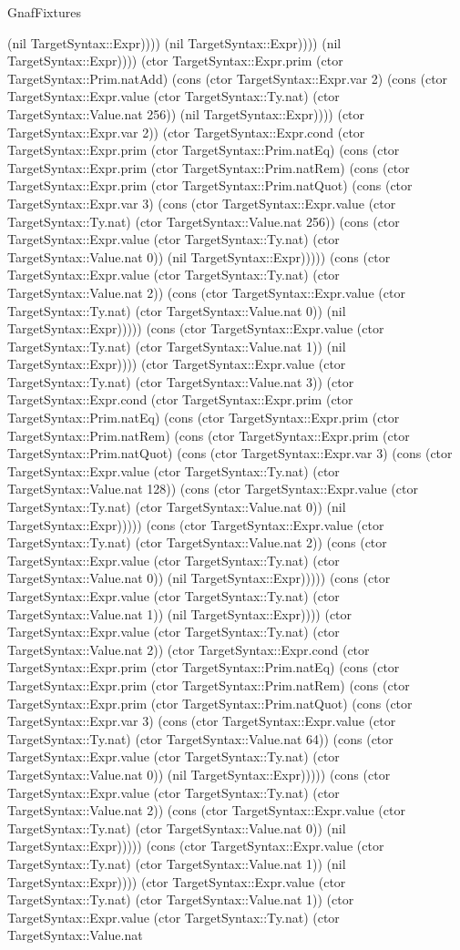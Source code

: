 \begin{lexlean}{GnafFixtures}
\begin{semanticmodule}
{(nil TargetSyntax::Expr)))) (nil TargetSyntax::Expr)))) (nil TargetSyntax::Expr)))) (ctor TargetSyntax::Expr.prim (ctor TargetSyntax::Prim.natAdd) (cons (ctor TargetSyntax::Expr.var 2) (cons (ctor TargetSyntax::Expr.value (ctor TargetSyntax::Ty.nat) (ctor TargetSyntax::Value.nat 256)) (nil TargetSyntax::Expr)))) (ctor TargetSyntax::Expr.var 2)) (ctor TargetSyntax::Expr.cond (ctor TargetSyntax::Expr.prim (ctor TargetSyntax::Prim.natEq) (cons (ctor TargetSyntax::Expr.prim (ctor TargetSyntax::Prim.natRem) (cons (ctor TargetSyntax::Expr.prim (ctor TargetSyntax::Prim.natQuot) (cons (ctor TargetSyntax::Expr.var 3) (cons (ctor TargetSyntax::Expr.value (ctor TargetSyntax::Ty.nat) (ctor TargetSyntax::Value.nat 256)) (cons (ctor TargetSyntax::Expr.value (ctor TargetSyntax::Ty.nat) (ctor TargetSyntax::Value.nat 0)) (nil TargetSyntax::Expr))))) (cons (ctor TargetSyntax::Expr.value (ctor TargetSyntax::Ty.nat) (ctor TargetSyntax::Value.nat 2)) (cons (ctor TargetSyntax::Expr.value (ctor TargetSyntax::Ty.nat) (ctor TargetSyntax::Value.nat 0)) (nil TargetSyntax::Expr))))) (cons (ctor TargetSyntax::Expr.value (ctor TargetSyntax::Ty.nat) (ctor TargetSyntax::Value.nat 1)) (nil TargetSyntax::Expr)))) (ctor TargetSyntax::Expr.value (ctor TargetSyntax::Ty.nat) (ctor TargetSyntax::Value.nat 3)) (ctor TargetSyntax::Expr.cond (ctor TargetSyntax::Expr.prim (ctor TargetSyntax::Prim.natEq) (cons (ctor TargetSyntax::Expr.prim (ctor TargetSyntax::Prim.natRem) (cons (ctor TargetSyntax::Expr.prim (ctor TargetSyntax::Prim.natQuot) (cons (ctor TargetSyntax::Expr.var 3) (cons (ctor TargetSyntax::Expr.value (ctor TargetSyntax::Ty.nat) (ctor TargetSyntax::Value.nat 128)) (cons (ctor TargetSyntax::Expr.value (ctor TargetSyntax::Ty.nat) (ctor TargetSyntax::Value.nat 0)) (nil TargetSyntax::Expr))))) (cons (ctor TargetSyntax::Expr.value (ctor TargetSyntax::Ty.nat) (ctor TargetSyntax::Value.nat 2)) (cons (ctor TargetSyntax::Expr.value (ctor TargetSyntax::Ty.nat) (ctor TargetSyntax::Value.nat 0)) (nil TargetSyntax::Expr))))) (cons (ctor TargetSyntax::Expr.value (ctor TargetSyntax::Ty.nat) (ctor TargetSyntax::Value.nat 1)) (nil TargetSyntax::Expr)))) (ctor TargetSyntax::Expr.value (ctor TargetSyntax::Ty.nat) (ctor TargetSyntax::Value.nat 2)) (ctor TargetSyntax::Expr.cond (ctor TargetSyntax::Expr.prim (ctor TargetSyntax::Prim.natEq) (cons (ctor TargetSyntax::Expr.prim (ctor TargetSyntax::Prim.natRem) (cons (ctor TargetSyntax::Expr.prim (ctor TargetSyntax::Prim.natQuot) (cons (ctor TargetSyntax::Expr.var 3) (cons (ctor TargetSyntax::Expr.value (ctor TargetSyntax::Ty.nat) (ctor TargetSyntax::Value.nat 64)) (cons (ctor TargetSyntax::Expr.value (ctor TargetSyntax::Ty.nat) (ctor TargetSyntax::Value.nat 0)) (nil TargetSyntax::Expr))))) (cons (ctor TargetSyntax::Expr.value (ctor TargetSyntax::Ty.nat) (ctor TargetSyntax::Value.nat 2)) (cons (ctor TargetSyntax::Expr.value (ctor TargetSyntax::Ty.nat) (ctor TargetSyntax::Value.nat 0)) (nil TargetSyntax::Expr))))) (cons (ctor TargetSyntax::Expr.value (ctor TargetSyntax::Ty.nat) (ctor TargetSyntax::Value.nat 1)) (nil TargetSyntax::Expr)))) (ctor TargetSyntax::Expr.value (ctor TargetSyntax::Ty.nat) (ctor TargetSyntax::Value.nat 1)) (ctor TargetSyntax::Expr.value (ctor TargetSyntax::Ty.nat) (ctor TargetSyntax::Value.nat }
\end{semanticmodule}
\end{lexlean}
